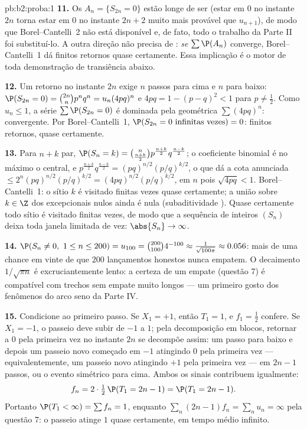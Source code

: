 \begin{solution}{pb:b2:proba:1}
\textbf{11.} Os  $A_n = \{S_{2n} = 0\}$ estão longe de ser
 (estar em $0$ no instante $2n$ torna estar em $0$ no
instante $2n + 2$ muito mais provável que $u_{n+1}$), de modo que
Borel--Cantelli~2 não está disponível e, de fato, todo o trabalho
da Parte II foi substituí-lo. A outra direção não precisa de
: \emph{se} $\sum\P(A_n)$ converge,
Borel--Cantelli~1 dá finitos retornos quase certamente.
Essa implicação é o motor de toda demonstração de transiência
abaixo.

\textbf{12.} Um retorno no instante $2n$ exige $n$ passos para cima e $n$
para baixo: $\P(S_{2n} = 0) = \binom{2n}np^nq^n =
u_n(4pq)^n$ e $4pq = 1 - (p - q)^2 < 1$ para $p \neq
\frac12$. Como $u_n \leq 1$, a série $\sum\P(S_{2n} = 0)$
é dominada pela geométrica $\sum(4pq)^n$: convergente. Por
Borel--Cantelli~1, $\P(S_{2n} = 0 \text{ infinitas vezes}) =
0$: finitos retornos, quase certamente.

\textbf{13.} Para $n + k$ par, $\P(S_n = k) =
\binom{n}{\frac{n+k}2}p^{\frac{n+k}2}q^{\frac{n-k}2}$; o
coeficiente binomial é no máximo o central, e
$p^{\frac{n+k}2}q^{\frac{n-k}2} = (pq)^{n/2}(p/q)^{k/2}$,
o que dá a cota anunciada $\leq
2^n(pq)^{n/2}(p/q)^{k/2} = (4pq)^{n/2}(p/q)^{k/2}$, 
em $n$ pois $\sqrt{4pq} < 1$. Borel--Cantelli~1: o sítio $k$ é
visitado finitas vezes quase certamente; a união sobre $k \in
\Z$ dos  excepcionais nulos ainda é nula (subaditividade
). Quase certamente todo sítio é visitado finitas
vezes, de modo que a sequência de inteiros $(S_n)$ deixa toda janela
limitada de vez: $\abs{S_n} \to \infty$.

\textbf{14.} $\P(S_n \neq 0,\ 1 \leq n \leq 200) = u_{100} =
\binom{200}{100}4^{-100} \approx \frac1{\sqrt{100\pi}}
\approx 0.056$: mais de uma chance em vinte de que $200$
lançamentos honestos nunca empatem. O decaimento $1/\sqrt{\pi n}$ é
excruciantemente lento: a certeza de um empate (questão 7) é
compatível com trechos sem empate muito longos --- um primeiro
gosto dos fenômenos do arco seno da Parte IV.

\textbf{15.} Condicione ao primeiro passo. Se $X_1 = +1$, então
$T_1 = 1$, e $f_1 = \frac12$ confere. Se $X_1 = -1$, o
passeio deve subir de $-1$ a $1$; pela decomposição em blocos,
retornar a $0$ pela primeira vez no instante $2n$ se decompõe assim:
um passo para baixo e depois um passeio novo começado em $-1$ atingindo
$0$ pela primeira vez --- equivalentemente, um passeio novo atingindo
$+1$ pela primeira vez --- em $2n - 1$ passos, ou o evento simétrico para cima.
Ambos os sinais contribuem igualmente:
\[
f_n = 2\cdot\tfrac12\,\P(T_1 = 2n - 1) = \P(T_1 = 2n-1) .
\]
Portanto $\P(T_1 < \infty) = \sum f_n = 1$, enquanto $\sum_n(2n -
1)f_n = \sum_n u_n = \infty$ pela questão 7: o passeio atinge
$1$ quase certamente, em tempo médio infinito.


\end{solution}
